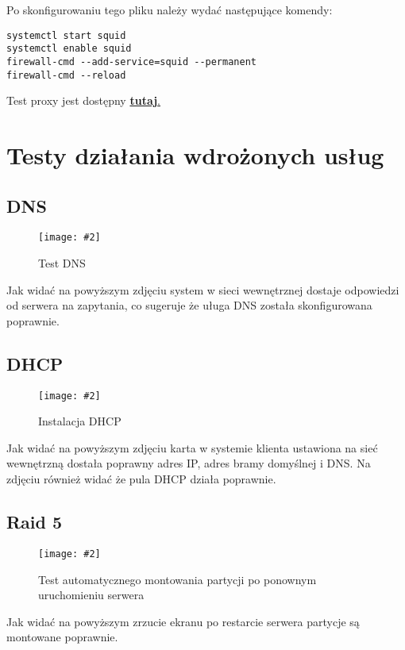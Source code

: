\documentclass[a4paper]{article}
\newcommand*{\zdj}[2][\textwidth]{\texttt{[image: \#2]}}
\newcommand*{\fg}[4][!htb]{
      \begin{figure*}[#1]
            \zdj{#2}
            \caption[#4]{#3}
      \end{figure*}
}
\newcommand*{\fgc}[5][!htb]{
      \begin{figure*}[#1]
            \phantomsection\label{fig:#5}
            \zdj{#2}
            \caption[#4]{#3}
      \end{figure*}
}
\begin{document}
\newpage
Po skonfigurowaniu tego pliku należy wydać następujące komendy:
\begin{Verbatim}[frame=single]
systemctl start squid
systemctl enable squid
firewall-cmd --add-service=squid --permanent
firewall-cmd --reload
\end{Verbatim}

Test proxy jest dostępny \hyperref[fig:proxy-test]{\textbf{tutaj}.}



\newpage


\section{Testy działania wdrożonych usług}
\subsection{DNS}
\vspace*{-10pt}
\fgc{contents/configuration/DNS/8.png}{Test DNS}{Test DNS}{dns-test}
Jak widać na powyższym zdjęciu system w sieci wewnętrznej dostaje odpowiedzi od serwera na zapytania, co sugeruje że uługa DNS została skonfigurowana poprawnie. 
\vspace*{-10pt}
\subsection{DHCP}
\vspace*{-10pt}
\fgc{contents/configuration/DHCP/4.png}{Instalacja DHCP}{Instalacja DHCP}{dhcp-test}
\vspace*{-5pt}
Jak widać na powyższym zdjęciu karta w systemie klienta ustawiona na sieć wewnętrzną dostała poprawny adres IP, adres bramy domyślnej i DNS. Na zdjęciu również widać że pula DHCP działa poprawnie. 
\newpage
\subsection{Raid 5}
\fgc{contents/configuration/Raid5/10.png}{Test automatycznego montowania partycji po ponownym uruchomieniu serwera}{Test automatycznego montowania}{raid5-auto-mount-test}
Jak widać na powyższym zrzucie ekranu po restarcie serwera partycje są montowane poprawnie. 
\end{document}
